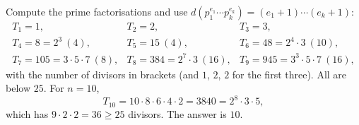 Compute the prime factorisations and use $d\left(p_1^{e_1}\cdots p_k^{e_k}\right)=(e_1+1)\cdots(e_k+1)$:
\[
\begin{array}{lll}
T_1=1, & T_2=2, & T_3=3,\\
T_4=8=2^3\ (4), & T_5=15\ (4), & T_6=48=2^4\cdot3\ (10),\\
T_7=105=3\cdot5\cdot7\ (8), & T_8=384=2^7\cdot3\ (16), & T_9=945=3^3\cdot5\cdot7\ (16),
\end{array}
\]
with the number of divisors in brackets (and $1$, $2$, $2$ for the first three). All are below $25$. For $n=10$,
\[
T_{10}=10\cdot8\cdot6\cdot4\cdot2=3840=2^8\cdot3\cdot5,
\]
which has $9\cdot2\cdot2=36\ge25$ divisors. The answer is $\boxed{10}$.

